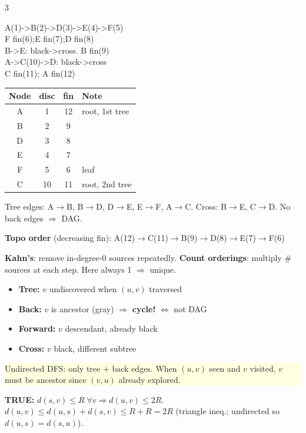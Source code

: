 \documentclass[9pt]{extarticle}
\newcommand{\yb}[1]{\vspace{1pt}\noindent\colorbox{lightyellow}{\parbox{\dimexpr\linewidth-2\fboxsep}{\footnotesize\sffamily #1}}\vspace{1pt}}
\newcommand{\gb}[1]{\vspace{1pt}\noindent\colorbox{lightmint}  {\parbox{\dimexpr\linewidth-2\fboxsep}{\footnotesize\sffamily #1}}\vspace{1pt}}
\newcommand{\cd}[1]{{\fontsize{7}{8.5}\selectfont\ttfamily\noindent #1}}
\begin{document}
\begin{multicols}{3}
\begin{tcolorbox}[blue,title=Master Graph + DFS (alpha from A)]
\cd{A(1)->B(2)->D(3)->E(4)->F(5)\\
F fin(6);E fin(7);D fin(8)\\
B->E: black->cross. B fin(9)\\
A->C(10)->D: black->cross\\
C fin(11); A fin(12)}

\begin{center}\scriptsize
\begin{tabular}{@{}cccl@{}}
\toprule
Node&disc&fin&Note\\\midrule
A&1&12&root, 1st tree\\
B&2&9&\\
D&3&8&\\
E&4&7&\\
F&5&6&leaf\\
C&10&11&root, 2nd tree\\\bottomrule
\end{tabular}
\end{center}

Tree edges: A$\to$B, B$\to$D, D$\to$E, E$\to$F, A$\to$C. Cross: B$\to$E, C$\to$D. No back edges $\Rightarrow$ DAG.

\gb{\textbf{Topo order} (decreasing fin): A(12)$\to$C(11)$\to$B(9)$\to$D(8)$\to$E(7)$\to$F(6) \checkmark}

\textbf{Kahn's}: remove in-degree-0 sources repeatedly. \textbf{Count orderings}: multiply \# sources at each step. Here always 1 $\Rightarrow$ unique.
\end{tcolorbox}

\vspace{3pt}
\begin{tcolorbox}[blue,title=DFS Edge Types]
\small
\begin{itemize}
  \item \textbf{Tree:} $v$ undiscovered when $(u,v)$ traversed
  \item \textbf{Back:} $v$ is ancestor (gray) $\Rightarrow$ \textbf{cycle!} $\Leftrightarrow$ not DAG
  \item \textbf{Forward:} $v$ descendant, already black
  \item \textbf{Cross:} $v$ black, different subtree
\end{itemize}
\yb{Undirected DFS: only tree + back edges. When $(u,v)$ seen and $v$ visited, $v$ must be ancestor since $(v,u)$ already explored.}
\end{tcolorbox}

\vspace{3pt}
\begin{tcolorbox}[purple,title=Graph T/F Traps]
\small
\gb{\textbf{TRUE:} $d(s,v)\leq R\;\forall v \Rightarrow d(u,v)\leq 2R$.\\ $d(u,v)\leq d(u,s)+d(s,v)\leq R{+}R{=}2R$ (triangle ineq.; undirected so $d(u,s)=d(s,u)$).}


\end{tcolorbox}
\end{multicols}
\end{document}

